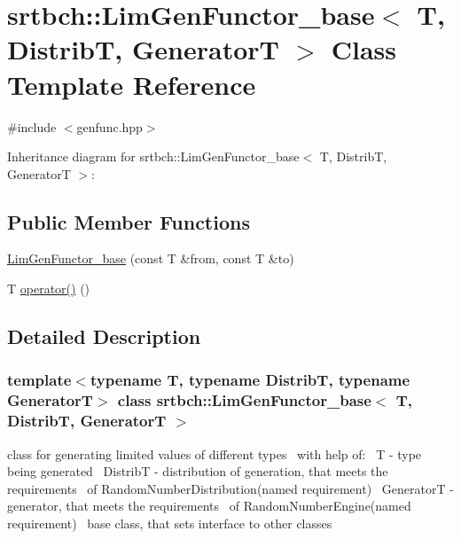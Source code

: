 \hypertarget{classsrtbch_1_1LimGenFunctor__base}{}\section{srtbch\+:\+:Lim\+Gen\+Functor\+\_\+base$<$ T, DistribT, GeneratorT $>$ Class Template Reference}
\label{classsrtbch_1_1LimGenFunctor__base}


{\ttfamily \#include $<$genfunc.\+hpp$>$}



Inheritance diagram for srtbch\+:\+:Lim\+Gen\+Functor\+\_\+base$<$ T, DistribT, GeneratorT $>$\+:
\subsection*{Public Member Functions}
\begin{DoxyCompactItemize}
\item 
\hyperlink{classsrtbch_1_1LimGenFunctor__base_a3f85c4e7af07d138d50af3d97a61912d}{Lim\+Gen\+Functor\+\_\+base} (const T \&from, const T \&to)
\item 
T \hyperlink{classsrtbch_1_1LimGenFunctor__base_a242d32ca0a61b11420916c247ee625c9}{operator()} ()
\end{DoxyCompactItemize}


\subsection{Detailed Description}
\subsubsection*{template$<$typename T, typename DistribT, typename GeneratorT$>$\newline
class srtbch\+::\+Lim\+Gen\+Functor\+\_\+base$<$ T, Distrib\+T, Generator\+T $>$}

class for generating limited values of different types~\newline
with help of\+:~\newline
T -\/ type being generated~\newline
DistribT -\/ distribution of generation, that meets the requirements~\newline
of Random\+Number\+Distribution(named requirement)~\newline
GeneratorT -\/ generator, that meets the requirements~\newline
of Random\+Number\+Engine(named requirement)~\newline
base class, that sets interface to other classes 

